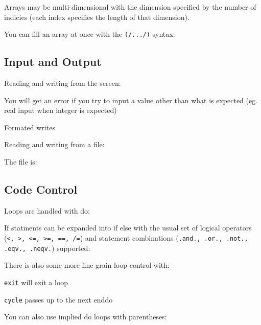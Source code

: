 Arrays may be multi-dimensional with the dimension specified by the number of indicies (each index specifies the length of that dimension).

You can fill an array at once with the \texttt{(/.../)} syntax.
\begin{quote}

\end{quote}


\subsection{Input and Output}
Reading and writing from the screen:
\begin{quote}

\end{quote}
\noindent You will get an error if you try to input a value other than what is expected (eg. real input when integer is expected)

Formated writes
\begin{quote}

\end{quote}

\noindent Reading and writing from a file:
\begin{quote}

\end{quote}
\noindent The file is:
\begin{quote}

\end{quote}

\subsection{Code Control}

Loops are handled with do:
\begin{quote}

\end{quote}

If statments can be expanded into if else with the usual set of logical operators
 (\texttt{<, >, <=, >=, ==, /=}) and statement combinations
 (\texttt{.and., .or., .not., .eqv., .neqv.}) supported:
\begin{quote}

\end{quote}

\noindent There is also some more fine-grain loop control with:

\texttt{exit} will exit a loop

\texttt{cycle} passes up to the next enddo
\begin{quote}

\end{quote}

\noindent You can also use implied do loops with parentheses:
\begin{quote}

\end{quote}
